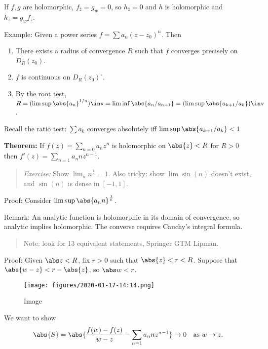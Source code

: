 If \(f, g\) are holomorphic, \(f_{\bar z} = g_{\bar w} = 0\), so
\(h_{\bar z} = 0\) and \(h\) is holomorphic and \(h_z = g_w f_z\).

Example: Given a power series \(f=\sum a_n (z- z_0)^n\). Then

\begin{enumerate}
\def\labelenumi{\arabic{enumi}.}
\tightlist
\item
  There exists a radius of convergence \(R\) such that \(f\) converges
  precisely on \(D_R(z_0)\).
\item
  \(f\) is continuous on \(D_R(z_0)^\circ\).
\item
  By the root test,
  \(R = (\limsup \abs{a_n}^{1/n})\inv = \liminf \abs{a_n/a_{n+1}} = (\limsup \abs{a_{k+1}/a_k})\inv\).
\end{enumerate}

Recall the ratio test: \(\sum a_k\) converges absolutely iff
\(\limsup \abs{a_{k+1} / a_k} < 1\)

\textbf{Theorem:} If \(f(z) = \sum_{n=0} a_n z^n\) is holomorphic on
\(\abs{z} < R\) for \(R> 0\) then \(f'(z) = \sum_{n=1} a_n n z^{n-1}\).

\begin{quote}
\emph{Exercise:} Show \(\lim_n n^{\frac 1 n} = 1\). Also tricky: show
\(\lim \sin(n)\) doesn't exist, and \(\sin(n)\) is dense in \([-1, 1]\).
\end{quote}

Proof: Consider \(\limsup \abs{a_n n}^{\frac 1 n}\).

Remark: An analytic function is holomorphic in its domain of
convergence, so analytic implies holomorphic. The converse requires
Cauchy's integral formula.

\begin{quote}
Note: look for 13 equivalent statements, Springer GTM Lipman.
\end{quote}

Proof: Given \(\abs z < R\), fix \(r>0\) such that \(\abs {z} < r < R\).
Suppose that \(\abs{w-z} < r - \abs{z}\), so \(\abs w < r\).

\begin{figure}
\centering
\texttt{[image: figures/2020-01-17-14:14.png]}
\caption{Image}
\end{figure}

We want to show \begin{align*}
\abs{S} = \abs{\frac{f(w) - f(z)}{w - z} - \sum_{n=1} a_n n z^{n-1}} \to 0 \quad \text{as } w\to z
.\end{align*}

